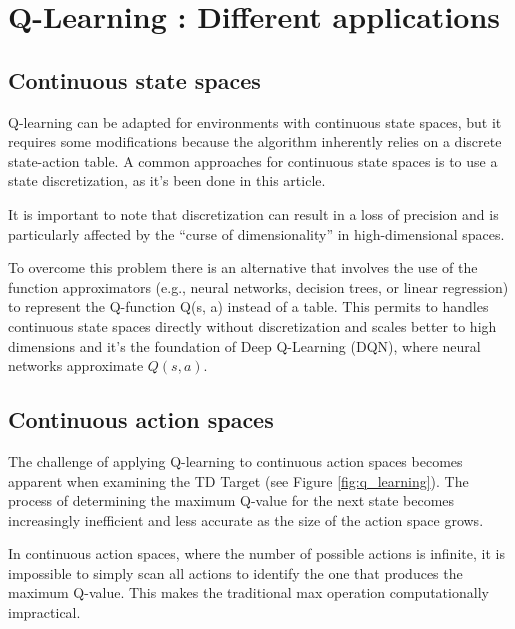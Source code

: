 \documentclass{article}
\begin{document}
\newpage

\section{Q-Learning : Different applications}

\subsection{Continuous state spaces}
Q-learning can be adapted for environments with continuous state spaces, but it requires some modifications because the algorithm inherently relies on a discrete state-action table. A common approaches for continuous state spaces is to use a state discretization, as it's been done in this article. 

It is important to note that discretization can result in a loss of precision and is particularly affected by the “curse of dimensionality”\cite{BELLMAN1958228} in high-dimensional spaces. 

To overcome this problem there is an alternative that involves the use of the function approximators (e.g., neural networks, decision trees, or linear regression) to represent the Q-function Q(s, a) instead of a table. This permits to handles continuous state spaces directly without discretization and scales better to high dimensions and it's the foundation of Deep Q-Learning (DQN), where neural networks approximate $ Q(s, a) $.
 
\subsection{Continuous action spaces}
The challenge of applying Q-learning to continuous action spaces becomes apparent when examining the TD Target (see Figure \ref{fig:q_learning}). The process of determining the maximum Q-value for the next state becomes increasingly inefficient and less accurate as the size of the action space grows.

In continuous action spaces, where the number of possible actions is infinite, it is impossible to simply scan all actions to identify the one that produces the maximum Q-value. This makes the traditional max operation computationally impractical.
\end{document}
